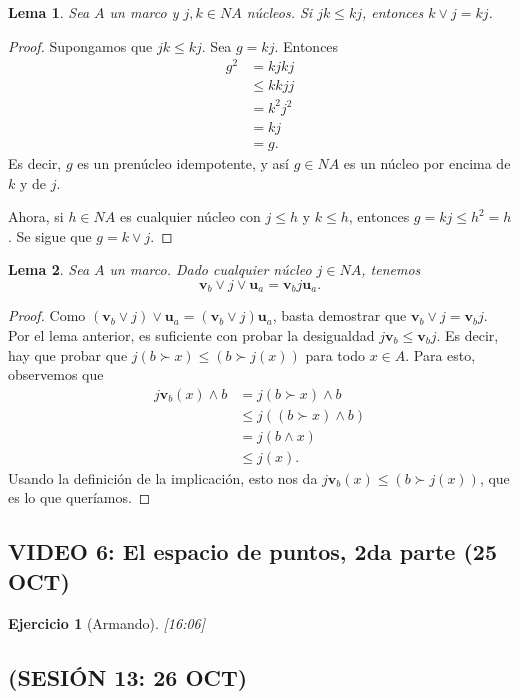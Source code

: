 \documentclass[12pt,letterpaper,titlepage]{article}
\newtheorem{exe}{Ejercicio}
\newtheorem*{lemma}{Lema}
\theoremstyle{definition}
\renewcommand\sup{\vee}
\renewcommand\inf{\wedge}
\newcommand\unuc[1]{\mathbf u_{#1}}
\newcommand\vnuc[1]{\mathbf v_{#1}}
\newcommand\<{\langle}
\renewcommand\>{\rangle}
\begin{document}
\begin{lemma}
  Sea $A$ un marco y $j,k\in NA$ núcleos.
  Si $jk\leq kj$, entonces $k\sup j = kj$.
\end{lemma}
\begin{proof}
  Supongamos que $jk\leq kj$.
  Sea $g=kj$.
  Entonces
  \begin{align*}
    g^2
    &= kjkj \\
    &\leq kkjj \\
    &= k^2j^2 \\
    &= kj \\
    &= g.
  \end{align*}
  Es decir, $g$ es un prenúcleo idempotente, y así $g\in NA$
  es un núcleo por encima de $k$ y de $j$.

  Ahora, si $h\in NA$ es cualquier núcleo con $j\leq h$ y $k\leq
  h$, entonces $g=kj\leq h^2=h$.
  Se sigue que $g=k\sup j$.
\end{proof}

\begin{lemma}
  Sea $A$ un marco.
  Dado cualquier núcleo $j\in NA$, tenemos
  \[
    \vnuc b \sup j \sup \unuc a = \vnuc b j \unuc a
  .\]
\end{lemma}
\begin{proof}
  Como $(\vnuc b \sup j)\sup \unuc a = (\vnuc b\sup j) \unuc a$, basta demostrar que $\vnuc b \sup j = \vnuc b j$.
  Por el lema anterior, es suficiente con probar la desigualdad
  $j\vnuc b \leq \vnuc b j$.
  Es decir, hay que probar que $j(b\succ x) \leq (b\succ j(x))$
  para todo $x\in A$.
  Para esto, observemos que
  \begin{align*}
    j\vnuc b (x) \inf b
    &= j(b\succ x) \inf b \\
    &\leq j((b\succ x)\inf b) \\
    &= j(b\inf x) \\
    &\leq j(x).
  \end{align*}
  Usando la definición de la implicación, esto nos da $j\vnuc
  b(x) \leq (b\succ j(x))$, que es lo que queríamos.
\end{proof}

\subsection{VIDEO 6: El espacio de puntos, 2da parte (25 OCT)}
\begin{exe}[Armando]
  [16:06]
\end{exe}
\subsection*{(SESIÓN 13: 26 OCT)}
\end{document}
